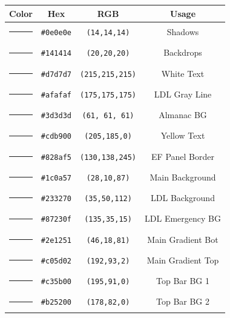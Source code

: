 \documentclass[a4paper,11pt]{refart}
\begin{document}
\begin{centering}
\begin{longtabu}{cccc}
  \textbf{Color}  & \textbf{Hex} & \textbf{RGB} & \textbf{Usage} \\
  \midrule
  \textcolor[rgb]{0.14, 0.14, 0.14}{\rule{.1\textwidth}{12pt}}  & \texttt{\#0e0e0e}    & \texttt{(14,14,14)} & Shadows \\
  \textcolor[rgb]{0.20, 0.20, 0.20}{\rule{.1\textwidth}{12pt}}  & \texttt{\#141414}    & \texttt{(20,20,20)} & Backdrops \\
  \textcolor[cmyk]{0, 0, 0, 0.16}{\rule{.1\textwidth}{12pt}}  & \texttt{\#d7d7d7}    & \texttt{(215,215,215)} & White Text \\
  \textcolor[cmyk]{0, 0, 0, 0.3137}{\rule{.1\textwidth}{12pt}}  & \texttt{\#afafaf}    & \texttt{(175,175,175)} & LDL Gray Line \\
  \textcolor[cmyk]{0, 0, 0, 0.7608}{\rule{.1\textwidth}{12pt}}  & \texttt{\#3d3d3d}    & \texttt{(61, 61, 61)} & Almanac BG \\
  \textcolor[cmyk]{0, 0.0976, 1, 0.1961}{\rule{.1\textwidth}{12pt}}  & \texttt{\#cdb900}    & \texttt{(205,185,0)} & Yellow Text \\
  \textcolor[cmyk]{0.47, 0.44, 0, 0.04}{\rule{.1\textwidth}{12pt}}  & \texttt{\#828af5}    & \texttt{(130,138,245)} & EF Panel Border \\
  \textcolor[cmyk]{0.68, 0.89, 0, 0.66}{\rule{.1\textwidth}{12pt}}  & \texttt{\#1c0a57}    & \texttt{(28,10,87)} & Main Background \\
  \textcolor[cmyk]{0.6875, 0.5536, 0, 0.5608}{\rule{.1\textwidth}{12pt}}  & \texttt{\#233270}    & \texttt{(35,50,112)} & LDL Background \\
  \textcolor[cmyk]{0, 0.7407, 0.8889, 0.4706}{\rule{.1\textwidth}{12pt}}  & \texttt{\#87230f}    & \texttt{(135,35,15)} & LDL Emergency BG \\
  \textcolor[cmyk]{0.4321, 0.7778, 0, 0.6824}{\rule{.1\textwidth}{12pt}}  & \texttt{\#2e1251}    & \texttt{(46,18,81)} & Main Gradient Bot \\
  \textcolor[cmyk]{0, 0.5156, 0.9896, 0.2471}{\rule{.1\textwidth}{12pt}}  & \texttt{\#c05d02}    & \texttt{(192,93,2)} & Main Gradient Top \\
  \textcolor[cmyk]{0, 0.5333, 1, 0.2353}{\rule{.1\textwidth}{12pt}}  & \texttt{\#c35b00}    & \texttt{(195,91,0)} & Top Bar BG 1 \\
  \textcolor[cmyk]{0, 0.5393, 1, 0.3020}{\rule{.1\textwidth}{12pt}}  & \texttt{\#b25200}    & \texttt{(178,82,0)} & Top Bar BG 2 \\

\end{longtabu}
\end{centering}
\end{document}
